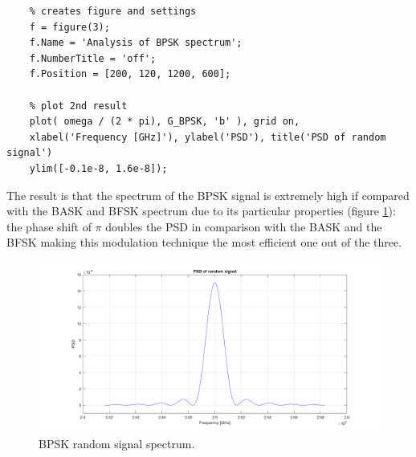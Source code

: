 \begin{lstlisting}
    % creates figure and settings
    f = figure(3);
    f.Name = 'Analysis of BPSK spectrum';
    f.NumberTitle = 'off';
    f.Position = [200, 120, 1200, 600];

    % plot 2nd result
    plot( omega / (2 * pi), G_BPSK, 'b' ), grid on,
    xlabel('Frequency [GHz]'), ylabel('PSD'), title('PSD of random signal')
    ylim([-0.1e-8, 1.6e-8]);
\end{lstlisting}

\noindent The result is that the spectrum of the BPSK signal is extremely high if compared with the BASK and BFSK spectrum due to its particular properties (figure \ref{fig:random-signal-spectrum}): the phase shift of $\pi$ doubles the PSD in comparison with the BASK and the BFSK making this modulation technique the most efficient one out of the three.

\begin{figure}[h]
    \centering
    \includegraphics[width = \textwidth]{../res/imgs/random-signal-spectrum.png}
    \caption{BPSK random signal spectrum.}
    \label{fig:random-signal-spectrum}
\end{figure}